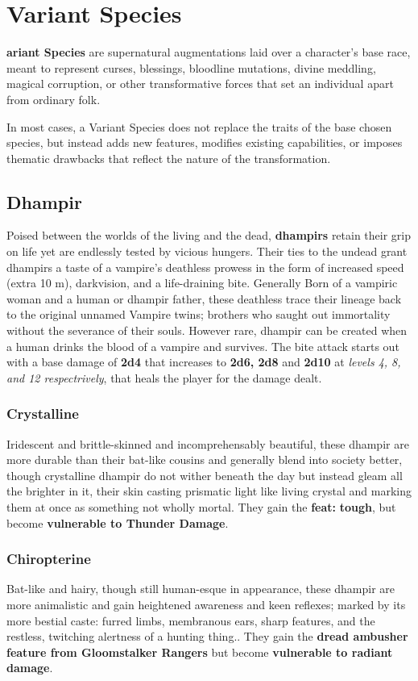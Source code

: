 \section{Variant Species}
\textbf{ariant Species} are supernatural augmentations laid over a character’s base race, meant to represent curses, blessings, bloodline mutations, divine meddling, magical corruption, or other transformative forces that set an individual apart from ordinary folk.

In most cases, a Variant Species does not replace the traits of the base chosen species, but instead adds new features, modifies existing capabilities, or imposes thematic drawbacks that reflect the nature of the transformation.

\subsection{Dhampir}
Poised between the worlds of the living and the dead, \textbf{dhampirs} retain their grip on life yet are endlessly tested by vicious hungers. Their ties to the undead grant dhampirs a taste of a vampire’s deathless prowess in the form of increased speed (extra 10 m), darkvision, and a life-draining bite. Generally Born of a vampiric woman and a human or dhampir father, these deathless trace their lineage back to the original unnamed Vampire twins; brothers who saught out immortality without the severance of their souls. However rare, dhampir can be created when a human drinks the blood of a vampire and survives. The bite attack starts out with a base damage of \textbf{2d4} that increases to \textbf{2d6, 2d8} and \textbf{2d10} at \textit{levels 4, 8, and 12 respectrively}, that heals the player for the damage dealt.

\subsubsection{Crystalline}
Iridescent and brittle-skinned and incomprehensably beautiful, these dhampir are more durable than their bat-like cousins and generally blend into society better, though crystalline dhampir do not wither beneath the day but instead gleam all the brighter in it, their skin casting prismatic light like living crystal and marking them at once as something not wholly mortal. They gain the \textbf{feat: }\textbf{tough}, but become \textbf{vulnerable to Thunder Damage}.

\subsubsection{Chiropterine}
Bat-like and hairy, though still human-esque in appearance, these dhampir are more animalistic and gain heightened awareness and keen reflexes; marked by its more bestial caste: furred limbs, membranous ears, sharp features, and the restless, twitching alertness of a hunting thing.. They gain the \textbf{dread ambusher feature from Gloomstalker Rangers} but become \textbf{vulnerable to radiant damage}.

